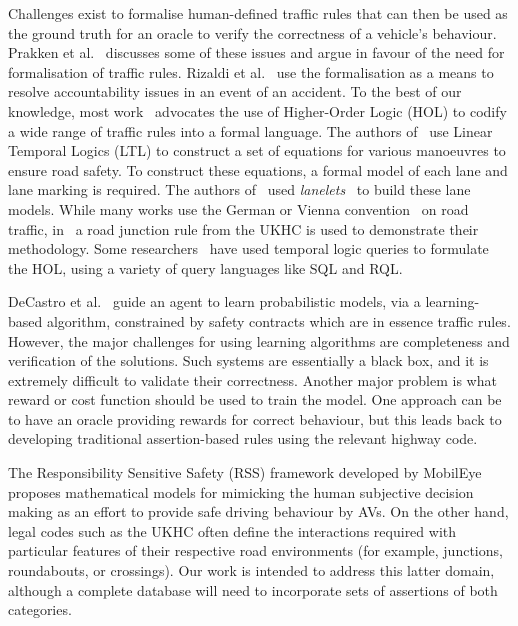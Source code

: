 
Challenges exist to formalise human-defined traffic rules that can then be used as the ground truth for an oracle to verify the correctness of a vehicle's behaviour. 
%
Prakken et al.~\cite{lawabidingstudy} discusses some of these issues and argue in favour of the need for formalisation of traffic rules. Rizaldi et al.~\cite{acountability} use the formalisation as a means to resolve accountability issues in an event of an accident. To the best of our knowledge, most work~\cite{acountability, esterle, rizaldi, alves} advocates the use of Higher-Order Logic (HOL) to codify a wide range of traffic rules into a formal language. The authors of~\cite{acountability, esterle, rizaldi, alves} use Linear Temporal Logics (LTL) to construct a set of equations for various manoeuvres to ensure road safety. To construct these equations, a formal model of each lane and lane marking is required. The authors of~\cite{rizaldi} used \textit{lanelets}~\cite{lanelets2014} to build these lane models. While many works use the German or Vienna convention~\cite{vienna} on road traffic, in~\cite{alves} a road junction rule from the UKHC is used to demonstrate their methodology. Some researchers~\cite{sqlhuang, sqlgueffaz} have used temporal logic queries to formulate the HOL, using a variety of query languages like SQL and RQL. 

DeCastro et al.~\cite{decastro2018counterexample} guide an agent to learn probabilistic models, via a learning-based algorithm, constrained by safety contracts which are in essence traffic rules. However, the major challenges for using learning algorithms are completeness and verification of the solutions. Such systems are essentially a black box, and it is extremely difficult to validate their correctness. Another major problem is what reward or cost function should be used to train the model. One approach can be to have an oracle providing rewards for correct behaviour, but this leads back to developing traditional assertion-based rules using the relevant highway code.

The Responsibility Sensitive Safety (RSS) framework developed by MobilEye~\cite{RSS_Shalev_Shwartz2017, RSS2_Koopman2019} proposes mathematical models for mimicking the human subjective decision making as an effort to provide safe driving behaviour by AVs. On the other hand, legal codes such as the UKHC often define the interactions required with particular features of their respective road environments (for example, junctions, roundabouts, or crossings). Our work is intended to address this latter domain, although a complete database will need to incorporate sets of assertions of both categories. 


